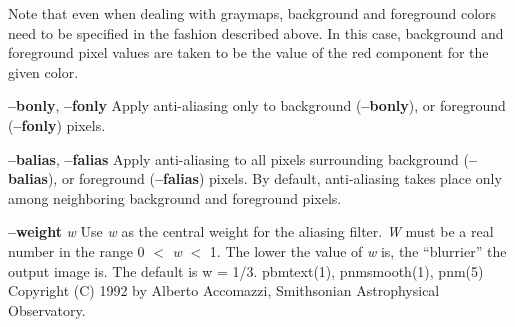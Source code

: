 \par\noindent
Note that even when dealing with graymaps, background and foreground
colors need to be specified in the fashion described above.
In this case, background and foreground pixel values are taken to be the
value of the red component for the given color.
\par
{\bf --bonly}{\rm ,}
{\bf --fonly}
Apply anti-aliasing only to background 
{\rm (}{\bf --bonly}{\rm ),}
or foreground
{\rm (}{\bf --fonly}{\rm )}
pixels.
\par
{\bf --balias}{\rm ,}
{\bf --falias}
Apply anti-aliasing to all pixels surrounding background
{\rm (}{\bf --balias}{\rm ),}
or foreground
{\rm (}{\bf --falias}{\rm )}
pixels.  By default, anti-aliasing takes place only among neighboring
background and foreground pixels.
\par
{\bf --weight}
{\it w}
Use 
{\it w}
as the central weight for the aliasing filter.
{\it W}
must be a real number in the range
0 $<$ 
{\it w}
$<$ 1.
The lower the value of 
{\it w}
is, the ``blurrier'' the output image is.  The default is w = 1/3.
pbmtext(1), pnmsmooth(1), pnm(5)
Copyright (C) 1992 by Alberto Accomazzi, Smithsonian Astrophysical Observatory.
%

%

\newpage
%

